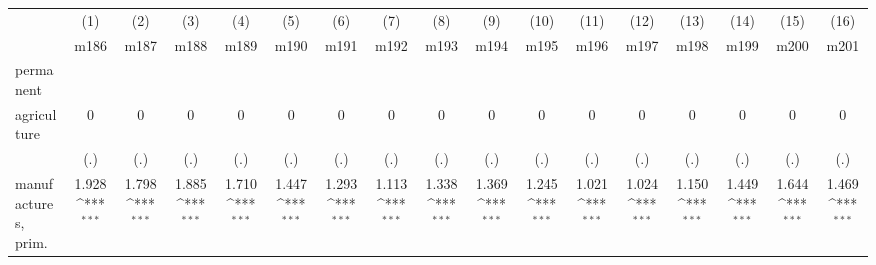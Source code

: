 {
\def\sym#1{\ifmmode^{#1}\else\(^{#1}\)\fi}
\begin{tabular}{l*{16}{c}}
\hline\hline
                    &\multicolumn{1}{c}{(1)}&\multicolumn{1}{c}{(2)}&\multicolumn{1}{c}{(3)}&\multicolumn{1}{c}{(4)}&\multicolumn{1}{c}{(5)}&\multicolumn{1}{c}{(6)}&\multicolumn{1}{c}{(7)}&\multicolumn{1}{c}{(8)}&\multicolumn{1}{c}{(9)}&\multicolumn{1}{c}{(10)}&\multicolumn{1}{c}{(11)}&\multicolumn{1}{c}{(12)}&\multicolumn{1}{c}{(13)}&\multicolumn{1}{c}{(14)}&\multicolumn{1}{c}{(15)}&\multicolumn{1}{c}{(16)}\\
                    &\multicolumn{1}{c}{m186}&\multicolumn{1}{c}{m187}&\multicolumn{1}{c}{m188}&\multicolumn{1}{c}{m189}&\multicolumn{1}{c}{m190}&\multicolumn{1}{c}{m191}&\multicolumn{1}{c}{m192}&\multicolumn{1}{c}{m193}&\multicolumn{1}{c}{m194}&\multicolumn{1}{c}{m195}&\multicolumn{1}{c}{m196}&\multicolumn{1}{c}{m197}&\multicolumn{1}{c}{m198}&\multicolumn{1}{c}{m199}&\multicolumn{1}{c}{m200}&\multicolumn{1}{c}{m201}\\
\hline
permanent           &                     &                     &                     &                     &                     &                     &                     &                     &                     &                     &                     &                     &                     &                     &                     &                     \\
agriculture         &           0         &           0         &           0         &           0         &           0         &           0         &           0         &           0         &           0         &           0         &           0         &           0         &           0         &           0         &           0         &           0         \\
                    &         (.)         &         (.)         &         (.)         &         (.)         &         (.)         &         (.)         &         (.)         &         (.)         &         (.)         &         (.)         &         (.)         &         (.)         &         (.)         &         (.)         &         (.)         &         (.)         \\
[1em]
manufactures, prim. &       1.928\sym{***}&       1.798\sym{***}&       1.885\sym{***}&       1.710\sym{***}&       1.447\sym{***}&       1.293\sym{***}&       1.113\sym{***}&       1.338\sym{***}&       1.369\sym{***}&       1.245\sym{***}&       1.021\sym{***}&       1.024\sym{***}&       1.150\sym{***}&       1.449\sym{***}&       1.644\sym{***}&       1.469\sym{***}\\

\end{tabular}}
